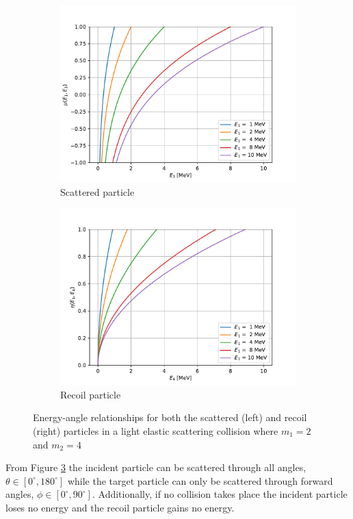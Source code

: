 \begin{figure}[!htb]
  \centering
  \begin{subfigure}{.5\textwidth}
    \centering
    \includegraphics[width=\linewidth]{../figures/particle_kinematics/light_energy_angle.pdf}
    \caption{Scattered particle}
    \label{fig:light-elastic-energy-angle-scattered}
  \end{subfigure}%
  \begin{subfigure}{.5\textwidth}
    \centering
    \includegraphics[width=\linewidth]{../figures/particle_kinematics/light_recoil_energy_angle.pdf}
    \caption{Recoil particle}
    \label{fig:light-elastic-energy-angle-recoil}
  \end{subfigure}
  \caption{Energy-angle relationships for both the scattered (left) and recoil (right) particles in a light elastic scattering collision where $m_1 = 2$ and $m_2 = 4$}
  \label{fig:light-elastic-energy-angle}
\end{figure}
From Figure \ref{fig:light-elastic-energy-angle} the incident particle can be scattered through all angles, $\theta \in [0^{\circ}, 180^{\circ}]$ while the target particle can only be scattered through forward angles, $\phi \in [0^{\circ}, 90^{\circ}]$. Additionally, if no collision takes place the incident particle loses no energy and the recoil particle gains no energy. 

